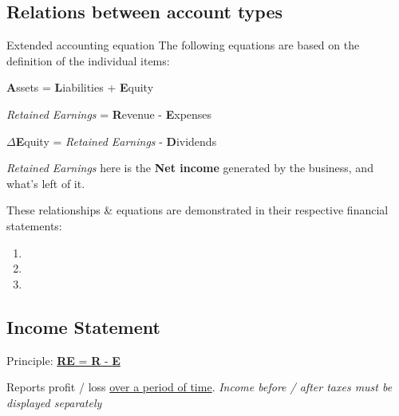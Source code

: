 \subsection{Relations between account types}
\begin{theorem}
    {Extended accounting equation}
    The following equations are based on the definition of the individual items:
    \begin{center}
        \textbf{A}ssets = \textbf{L}iabilities + \textbf{E}quity

        \textit{Retained Earnings} = \textbf{R}evenue - \textbf{E}xpenses

        $\Delta$\textbf{E}quity = \textit{Retained Earnings} - \textbf{D}ividends
    \end{center}
    \textit{Retained Earnings} here is the \textbf{Net income} generated by the business, and what's left of it.

    These relationships \& equations are demonstrated in their respective financial statements:
    \begin{enumerate}
        \item {}
        \item {}
        \item {}
    \end{enumerate}
    \label{thm:relations}
\end{theorem}

\subsection{Income Statement}
\label{sec:income_statement}

Principle: \hyperref[thm:relations]{\textbf{RE} = \textbf{R} - \textbf{E}}

Reports profit / loss \underline{over a period of time}. \textit{Income before / after taxes must be displayed separately}

